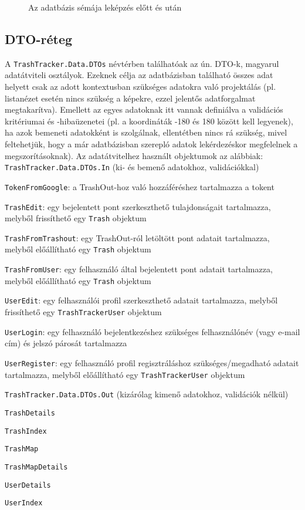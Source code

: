 \begin{figure}[H]
	\centering
	\vspace{5pt}
	\caption{Az adatbázis sémája leképzés előtt és után}
	\label{fig:database_scheme}
\end{figure}

\subsection{DTO-réteg}

A \texttt{TrashTracker.Data.DTOs} névtérben találhatóak az ún. DTO-k, magyarul adatátviteli osztályok. Ezeknek célja az adatbázisban található összes adat helyett csak az adott kontextusban szükséges adatokra való projektálás (pl. listanézet esetén nincs szükség a képekre, ezzel jelentős adatforgalmat megtakarítva). Emellett az egyes adatoknak itt vannak definiálva a validációs kritériumai és -hibaüzenetei (pl. a koordináták -180 és 180 között kell legyenek), ha azok bemeneti adatokként is szolgálnak, ellentétben nincs rá szükség, mivel feltehetjük, hogy a már adatbázisban szerepló adatok lekérdezéskor megfelelnek a megszorításoknak). Az adatátvitelhez használt objektumok az alábbiak:\\
\texttt{TrashTracker.Data.DTOs.In} (ki- és bemenő adatokhoz, validációkkal)
\begin{compactitem}
	\item \texttt{TokenFromGoogle}: a TrashOut-hoz való hozzáféréshez tartalmazza a tokent
	\item \texttt{TrashEdit}: egy bejelentett pont szerkeszthető tulajdonságait tartalmazza, melyből frissíthető egy \texttt{Trash} objektum
	\item \texttt{TrashFromTrashout}: egy TrashOut-ról letöltött pont adatait tartalmazza, melyből előállítható egy \texttt{Trash} objektum
	\item \texttt{TrashFromUser}: egy felhasználó által bejelentett pont adatait tartalmazza, melyből előállítható egy \texttt{Trash} objektum
	\item \texttt{UserEdit}: egy felhasználói profil szerkeszthető adatait tartalmazza, melyből frissíthető egy \texttt{TrashTrackerUser} objektum
	\item \texttt{UserLogin}: egy felhasználó bejelentkezéshez szükséges felhasználónév (vagy e-mail cím) és jelszó párosát tartalmazza
	\item \texttt{UserRegister}: egy felhasználó profil regisztráláshoz szükséges/megadható adatait tartalmazza, melyből előállítható egy \texttt{TrashTrackerUser} objektum
\end{compactitem}
\texttt{TrashTracker.Data.DTOs.Out} (kizárólag kimenő adatokhoz, validációk nélkül)
\begin{compactitem}
	\item \texttt{TrashDetails}
	\item \texttt{TrashIndex}
	\item \texttt{TrashMap}
	\item \texttt{TrashMapDetails}
	\item \texttt{UserDetails}
	\item \texttt{UserIndex}
\end{compactitem}